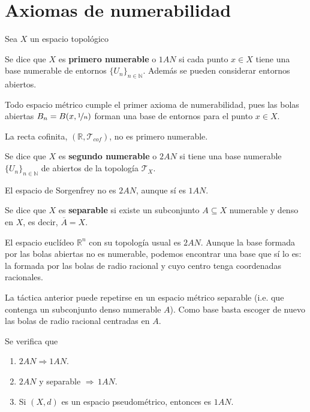 \section{Axiomas de numerabilidad}
Sea $X$ un espacio topol\'ogico
\begin{defi}
   Se dice que $X$ es \textbf{primero numerable} o $1AN$ si cada punto $x \in X$ tiene una base numerable de entornos $\{U_n\}_{n \in \mathbb{N}}$. Adem\'as se pueden considerar entornos abiertos.
\end{defi}
\begin{ejem}
Todo espacio métrico cumple el primer axioma de numerabilidad, pues las bolas abiertas 
{$\displaystyle B_{n}=B(x,\nicefrac{1}{n})$} forman una base de entornos para el punto $ x\in X$. 

La recta cofinita, $\displaystyle (\mathbb {R} ,\mathcal{T} _{cof})$, no es primero numerable.
\end{ejem}
\begin{defi}
    Se dice que $X$ es \textbf{segundo numerable} o $2AN$ si tiene una base numerable $\{U_n\}_{n \in \mathbb{N}}$ de abiertos de la topología $\mathcal{T}_X$.
\end{defi}
\begin{ejem}
    El espacio de Sorgenfrey no es $2AN$, aunque sí es $1AN$.
\end{ejem}
\begin{defi}
    Se dice que $X$ es \textbf{separable} si existe un subconjunto $A \subseteq X$ numerable y denso en $X$, es decir, $\overline{A} = X$.
\end{defi}
\begin{ejem}
    El espacio euclídeo $\mathbb {R} ^{n}$ con su topología usual es $2AN$. Aunque la base formada por las bolas abiertas no es numerable, podemos encontrar una base que sí lo es: la formada por las bolas de radio racional y cuyo centro tenga coordenadas racionales.

La táctica anterior puede repetirse en un espacio métrico separable (i.e. que contenga un subconjunto denso numerable $A$). Como base basta escoger de nuevo las bolas de radio racional centradas en $A$.
\end{ejem}
\begin{prop}
    Se verifica que 
    \begin{enumerate}
        \item $2AN \Rightarrow 1AN$.
        \item $2AN$ y separable $\Rightarrow \, 1AN$.
        \item Si $(X,d)$ es un espacio pseudom\'etrico, entonces es $1AN$.
    \end{enumerate} 
\end{prop}

